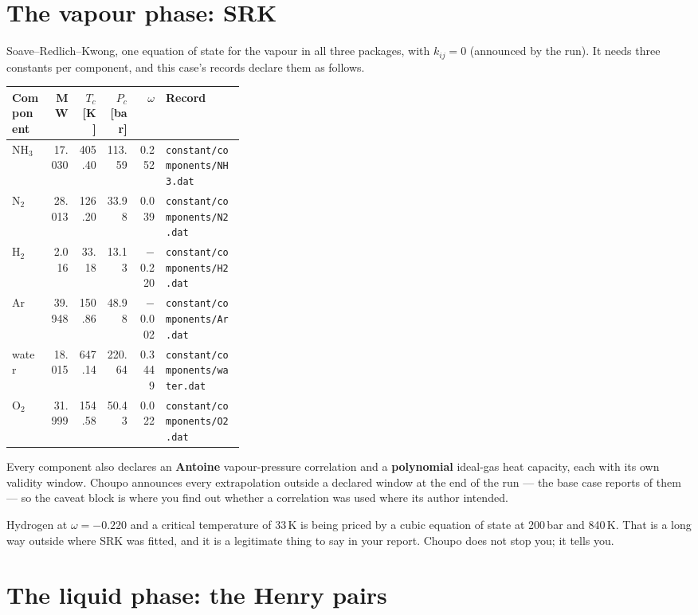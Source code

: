 \documentclass[11pt,a4paper]{article}
\begin{document}
\section{The vapour phase: SRK}

Soave--Redlich--Kwong, one equation of state for the vapour in all three
packages, with $k_{ij} = 0$ (announced by the run). It needs three constants
per component, and this case's records declare them as follows.

{\small\begin{longtable}{@{}lrrrrL{0.34\linewidth}@{}}
\toprule
\textbf{Component} & \textbf{MW} & \textbf{$T_c$ [K]} & \textbf{$P_c$ [bar]} &
  \textbf{$\omega$} & \textbf{Record} \\
\midrule
\endhead
NH$_3$  & 17.030 & 405.40 & 113.59 & \phantom{$-$}0.252  & \texttt{constant/components/NH3.dat} \\
N$_2$   & 28.013 & 126.20 &  33.98 & \phantom{$-$}0.039  & \texttt{constant/components/N2.dat} \\
H$_2$   &  2.016 &  33.18 &  13.13 & $-$0.220 & \texttt{constant/components/H2.dat} \\
Ar      & 39.948 & 150.86 &  48.98 & $-$0.002 & \texttt{constant/components/Ar.dat} \\
water   & 18.015 & 647.14 & 220.64 & \phantom{$-$}0.3449 & \texttt{constant/components/water.dat} \\
O$_2$   & 31.999 & 154.58 &  50.43 & \phantom{$-$}0.022  & \texttt{constant/components/O2.dat} \\
\bottomrule
\end{longtable}}

Every component also declares an \textbf{Antoine} vapour-pressure correlation
and a \textbf{polynomial} ideal-gas heat capacity, each with its own validity
window. Choupo announces every extrapolation outside a declared window at the
end of the run --- the base case reports  of them --- so the
caveat block is where you find out whether a correlation was used where its
author intended.

\begin{caveat}
Hydrogen at $\omega = -0.220$ and a critical temperature of 33\,K is being
priced by a cubic equation of state at 200\,bar and 840\,K. That is a long way
outside where SRK was fitted, and it is a legitimate thing to say in your
report. Choupo does not stop you; it tells you.
\end{caveat}

\section{The liquid phase: the Henry pairs}
\end{document}

